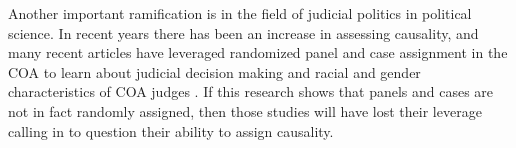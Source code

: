 \documentclass[12pt]{article}
\begin{document}
Another important ramification is in the field of judicial politics in political science.  In recent years there has been an increase in assessing causality, and many recent articles have leveraged randomized panel and case assignment in the COA to learn about judicial decision making and racial and gender characteristics of COA judges \citep{Kastellec2010,Glynn2015,Farhang2014}.  If this research shows that panels and cases are not in fact randomly assigned, then those studies will have lost their leverage calling in to question their ability to assign causality.



\end{document}
